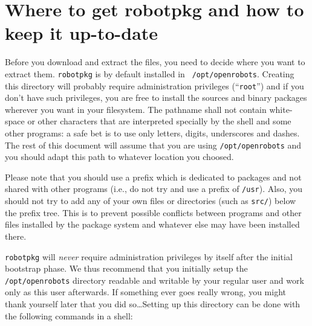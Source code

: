 %
%
%
%
%


\section{Where to get robotpkg and how to keep it up-to-date} %
\label{section:getting}

Before you download and extract the files, you need to decide where you want to
extract  them.     {\tt   robotpkg}  is     by  default   installed   in   {\tt
/opt/openrobots}. Creating this directory  will probably require administration
privileges (``{\tt root}'') and if you don't have such privileges, you are free
to  install the   sources  and  binary   packages wherever you  want  in   your
filesystem. The pathname shall not contain white-space or other characters that
are interpreted specially  by the shell and some  other programs: a safe bet is
to use only letters, digits, underscores and dashes.  The rest of this document
will assume that you are using {\tt /opt/openrobots}  and you should adapt this
path to whatever location you choosed.

Please note that you should use a prefix which is dedicated to packages and not
shared with other programs (i.e., do not try  and use a  prefix of {\tt /usr}).
Also, you should not try to add  any of your own  files or directories (such as
{\tt src/})  below  the prefix tree.    This is to  prevent  possible conflicts
between programs and other files  installed by the  package system and whatever
else may have been installed there.

{\tt robotpkg}   will {\em never} require   administration privileges by itself
after the initial bootstrap phase.  We thus  recommend that you initially setup
the {\tt /opt/openrobots} directory readable and writable  by your regular user
and work only as this  user afterwards.  If  something ever goes really  wrong,
you might thank yourself later that you did so\ldots  Setting up this directory
can be done with the following commands in a shell:

